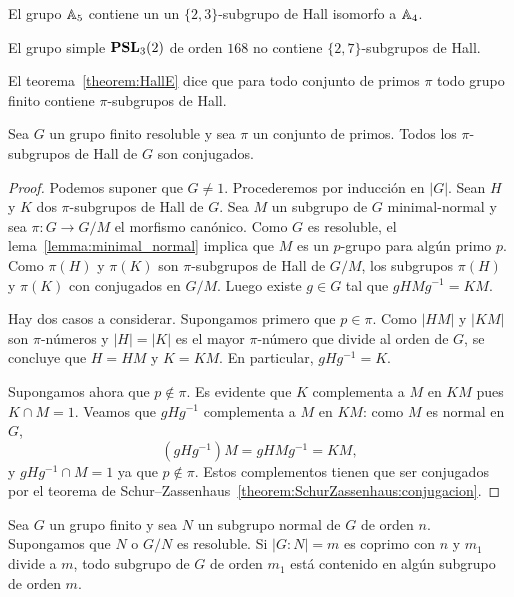 \begin{example}
	El grupo $\mathbb{A}_5$ contiene un un $\{2,3\}$-subgrupo de Hall isomorfo a
	$\mathbb{A}_4$.
\end{example}

\begin{example}
	El grupo simple $\mathbf{PSL}_3(2)$ de orden $168$ no contiene $\{2,7\}$-subgrupos
	de Hall.
\end{example}

\begin{remark}
	El teorema~\ref{theorem:HallE} dice que para todo conjunto de primos $\pi$
	todo grupo finito contiene $\pi$-subgrupos de Hall.
\end{remark}

\begin{theorem}[Hall]
	\label{theorem:HallC}
	Sea $G$ un grupo finito resoluble y sea $\pi$ un conjunto de primos. Todos los
	$\pi$-subgrupos de Hall de $G$ son conjugados.
\end{theorem}

\begin{proof}
	Podemos suponer que $G\ne1$. Procederemos por inducción en $|G|$.  Sean $H$
	y $K$ dos $\pi$-subgrupos de Hall de $G$. Sea $M$ un subgrupo de $G$
	minimal-normal y sea $\pi\colon G\to G/M$ el morfismo canónico. Como $G$ es
	resoluble, el lema~\ref{lemma:minimal_normal} implica que  $M$ es un
	$p$-grupo para algún primo $p$.  Como $\pi(H)$ y $\pi(K)$ son
	$\pi$-subgrupos de Hall de $G/M$, los subgrupos $\pi(H)$ y $\pi(K)$ con
	conjugados en $G/M$. Luego existe $g\in G$ tal que $gHMg^{-1}=KM$. 

	Hay dos casos a considerar. Supongamos primero que $p\in\pi$. Como $|HM|$ y
	$|KM|$ son $\pi$-números y $|H|=|K|$ es el mayor $\pi$-número que divide al
	orden de $G$, se concluye que $H=HM$ y $K=KM$. En particular, $gHg^{-1}=K$. 

	Supongamos ahora que $p\not\in\pi$. Es evidente que $K$ complementa a $M$ en
	$KM$ pues $K\cap M=1$. Veamos que $gHg^{-1}$ complementa a $M$ en $KM$:
	como $M$ es normal en $G$, 
	\[
	(gHg^{-1})M=gHMg^{-1}=KM,
	\]
	y $gHg^{-1}\cap M=1$ ya que $p\not\in\pi$. Estos complementos tienen que
	ser conjugados por el teorema de
	Schur--Zassenhaus~\ref{theorem:SchurZassenhaus:conjugacion}.
\end{proof}

\begin{corollary}
	Sea $G$ un grupo finito y sea $N$ un subgrupo normal de $G$ de orden $n$.
	Supongamos que $N$ o $G/N$ es resoluble. Si $|G:N|=m$ es coprimo con $n$ y
	$m_1$ divide a $m$, todo subgrupo de $G$ de orden $m_1$ está contenido en
	algún subgrupo de orden $m$.
\end{corollary}

